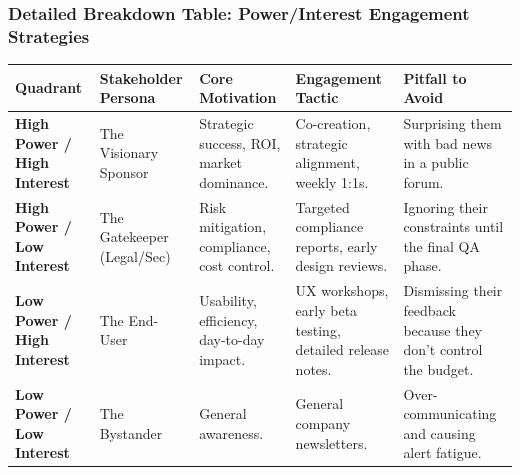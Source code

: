 \documentclass[
  11pt,
  openany,
  oneside]{book}
\begin{document}
\subsubsection{Detailed Breakdown Table: Power/Interest Engagement
Strategies}\label{detailed-breakdown-table-powerinterest-engagement-strategies}

\begin{longtable}[]{@{}
  >{\raggedright\arraybackslash}p{}
  >{\raggedright\arraybackslash}p{}
  >{\raggedright\arraybackslash}p{}
  >{\raggedright\arraybackslash}p{}
  >{\raggedright\arraybackslash}p{}@{}}
\toprule\noalign{}
\begin{minipage}[b]{\linewidth}\raggedright
Quadrant
\end{minipage} & \begin{minipage}[b]{\linewidth}\raggedright
Stakeholder Persona
\end{minipage} & \begin{minipage}[b]{\linewidth}\raggedright
Core Motivation
\end{minipage} & \begin{minipage}[b]{\linewidth}\raggedright
Engagement Tactic
\end{minipage} & \begin{minipage}[b]{\linewidth}\raggedright
Pitfall to Avoid
\end{minipage} \\
\midrule\noalign{}
\endhead
\bottomrule\noalign{}
\endlastfoot
\textbf{High Power / High Interest} & The Visionary Sponsor & Strategic
success, ROI, market dominance. & Co-creation, strategic alignment,
weekly 1:1s. & Surprising them with bad news in a public forum. \\
\textbf{High Power / Low Interest} & The Gatekeeper (Legal/Sec) & Risk
mitigation, compliance, cost control. & Targeted compliance reports,
early design reviews. & Ignoring their constraints until the final QA
phase. \\
\textbf{Low Power / High Interest} & The End-User & Usability,
efficiency, day-to-day impact. & UX workshops, early beta testing,
detailed release notes. & Dismissing their feedback because they don't
control the budget. \\
\textbf{Low Power / Low Interest} & The Bystander & General awareness. &
General company newsletters. & Over-communicating and causing alert
fatigue. \\
\end{longtable}
\end{document}
